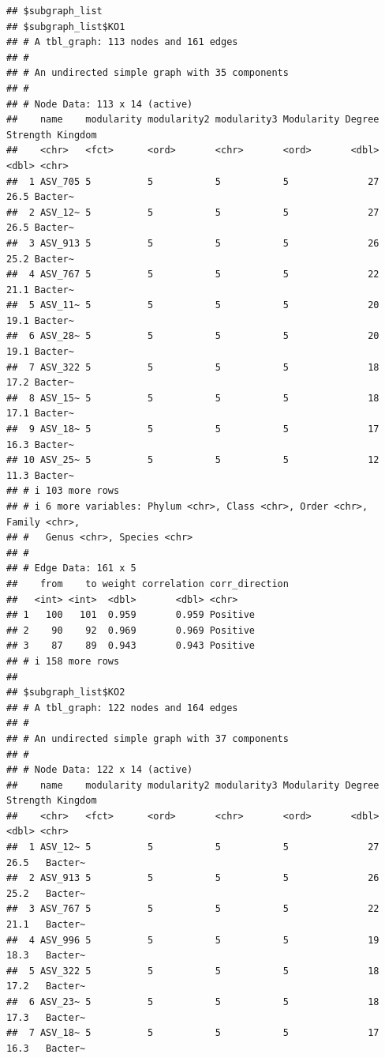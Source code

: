 \documentclass[
]{book}
\begin{document}
\begin{verbatim}
## $subgraph_list
## $subgraph_list$KO1
## # A tbl_graph: 113 nodes and 161 edges
## #
## # An undirected simple graph with 35 components
## #
## # Node Data: 113 x 14 (active)
##    name    modularity modularity2 modularity3 Modularity Degree Strength Kingdom
##    <chr>   <fct>      <ord>       <chr>       <ord>       <dbl>    <dbl> <chr>  
##  1 ASV_705 5          5           5           5              27     26.5 Bacter~
##  2 ASV_12~ 5          5           5           5              27     26.5 Bacter~
##  3 ASV_913 5          5           5           5              26     25.2 Bacter~
##  4 ASV_767 5          5           5           5              22     21.1 Bacter~
##  5 ASV_11~ 5          5           5           5              20     19.1 Bacter~
##  6 ASV_28~ 5          5           5           5              20     19.1 Bacter~
##  7 ASV_322 5          5           5           5              18     17.2 Bacter~
##  8 ASV_15~ 5          5           5           5              18     17.1 Bacter~
##  9 ASV_18~ 5          5           5           5              17     16.3 Bacter~
## 10 ASV_25~ 5          5           5           5              12     11.3 Bacter~
## # i 103 more rows
## # i 6 more variables: Phylum <chr>, Class <chr>, Order <chr>, Family <chr>,
## #   Genus <chr>, Species <chr>
## #
## # Edge Data: 161 x 5
##    from    to weight correlation corr_direction
##   <int> <int>  <dbl>       <dbl> <chr>         
## 1   100   101  0.959       0.959 Positive      
## 2    90    92  0.969       0.969 Positive      
## 3    87    89  0.943       0.943 Positive      
## # i 158 more rows
## 
## $subgraph_list$KO2
## # A tbl_graph: 122 nodes and 164 edges
## #
## # An undirected simple graph with 37 components
## #
## # Node Data: 122 x 14 (active)
##    name    modularity modularity2 modularity3 Modularity Degree Strength Kingdom
##    <chr>   <fct>      <ord>       <chr>       <ord>       <dbl>    <dbl> <chr>  
##  1 ASV_12~ 5          5           5           5              27   26.5   Bacter~
##  2 ASV_913 5          5           5           5              26   25.2   Bacter~
##  3 ASV_767 5          5           5           5              22   21.1   Bacter~
##  4 ASV_996 5          5           5           5              19   18.3   Bacter~
##  5 ASV_322 5          5           5           5              18   17.2   Bacter~
##  6 ASV_23~ 5          5           5           5              18   17.3   Bacter~
##  7 ASV_18~ 5          5           5           5              17   16.3   Bacter~

\end{verbatim}
\end{document}
